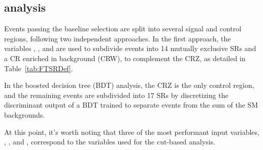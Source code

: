 

\subsection{\smft analysis}

Events passing the baseline selection are split into several signal and
control regions, following two independent approaches. In the first approach,
the variables \Njets, \Nbjets, and \Nleps are used to subdivide events into
14 mutually exclusive SRs and a CR enriched in \ttW background (CRW), to
complement the CRZ, as detailed in Table~\ref{tab:FTSRDef}.

In the boosted decision tree (BDT) analysis, the CRZ is the only control
region, and the remaining events are subdivided into 17 SRs by discretizing
the discriminant output of a BDT trained to separate \tttt events from the
sum of the SM backgrounds.

At this point, it's worth noting that 
three of the most performant input variables, \Njets, \Nbjets, and \Nleps, correspond to the variables used for the cut-based analysis.

